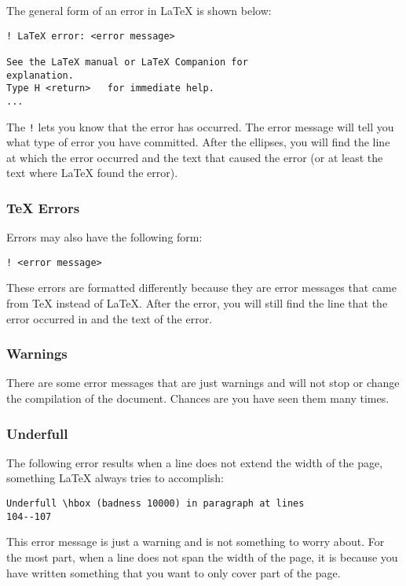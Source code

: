 The general form of an error in \LaTeX{} is shown below:
\begin{verbatim}
! LaTeX error: <error message>

See the LaTeX manual or LaTeX Companion for
explanation.
Type H <return>   for immediate help.
...
\end{verbatim}

The \texttt{!} lets you know that the error has occurred.  The error
message will tell you what type of error you have committed.  After
the ellipses, you will find the line at which the error occurred and
the text that caused the error (or at least the text where \LaTeX{}
found the error).

\subsubsection{\TeX{} Errors}
\label{sec:tex-errors}

Errors may also have the following form:
\begin{verbatim}
! <error message>
\end{verbatim}

These errors are formatted differently because they are error messages
that came from \TeX{} instead of \LaTeX{}.  After the error, you will
still find the line that the error occurred in and the text of the
error.

\subsubsection{Warnings}
\label{sec:warnings}

There are some error messages that are just warnings and will not stop
or change the compilation of the document.  Chances are you have seen
them many times.

\subsubsection{Underfull}
\label{sec:underfull}

The following error results when a line does not extend the width of
the page, something \LaTeX{} always tries to accomplish:
\begin{verbatim}
Underfull \hbox (badness 10000) in paragraph at lines
104--107
\end{verbatim}

This error message is just a warning and is not something to worry
about.  For the most part, when a line does not span the width of the
page, it is because you have written something that you want to only
cover part of the page.

